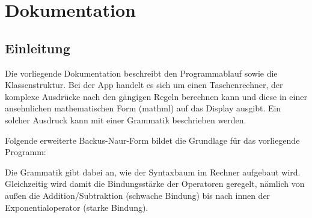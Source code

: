 \part{Dokumentation}
\chapter{Einleitung}
Die vorliegende Dokumentation beschreibt den Programmablauf sowie die Klassenstruktur.
Bei der App handelt es sich um einen Taschenrechner, 
der komplexe Ausdrücke nach den gängigen Regeln berechnen kann und diese in einer ansehnlichen mathematischen Form (mathml) auf das Display ausgibt.
Ein solcher Ausdruck kann mit einer Grammatik beschrieben werden. 

Folgende erweiterte Backus-Naur-Form bildet die Grundlage für das vorliegende Programm:


Die Grammatik gibt dabei an, wie der Syntaxbaum im Rechner aufgebaut wird.
Gleichzeitig wird damit die Bindungsstärke der Operatoren geregelt, 
nämlich von außen die Addition/Subtraktion (schwache Bindung) bis nach innen der Exponentialoperator (starke Bindung). 

